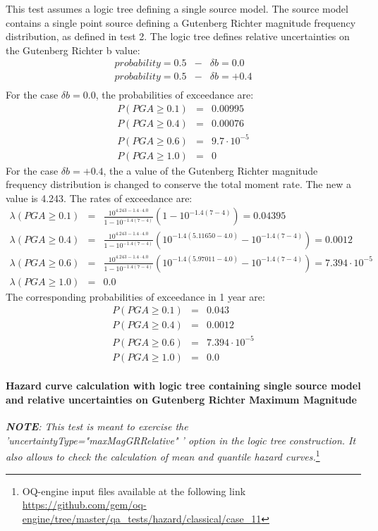 This
test assumes a logic tree defining a single source model. The source model
contains a single point source defining a Gutenberg Richter magnitude frequency
distribution, as defined in test 2. The logic tree defines relative
uncertainties on the Gutenberg Richter b value:
\begin{eqnarray}
probability = 0.5 &-& \delta b = 0.0 \nonumber \\
probability = 0.5 &-& \delta b = +0.4 \nonumber \\
\end{eqnarray}
For the case $\delta b = 0.0$, the probabilities of exceedance are:
\begin{eqnarray}
P(PGA \geq 0.1) &=& 0.00995 \nonumber \\
P(PGA \geq 0.4) &=& 0.00076 \nonumber \\
P(PGA \geq 0.6) &=& 9.7 \cdot 10^{-5} \nonumber \\
P(PGA \geq 1.0) &=& 0
\end{eqnarray}
For the case $\delta b = +0.4$, the a value of the Gutenberg Richter magnitude frequency distribution is changed to conserve the total moment rate. The
new a value is 4.243. The rates of exceedance are:
\begin{eqnarray}
\lambda(PGA \geq 0.1) &=&  \frac{10^{4.243 - 1.4 \cdot 4.0}}{1 - 10^{-1.4(7 - 4)}} (1 - 10^{-1.4(7 - 4)}) = 0.04395\nonumber \\ 
\lambda(PGA \geq 0.4) &=&  \frac{10^{4.243 - 1.4 \cdot 4.0}}{1 - 10^{-1.4(7 - 4)}} (10^{-1.4(5.11650 - 4.0)} - 10^{-1.4(7 - 4)}) = 0.0012\nonumber \\
\lambda(PGA \geq 0.6) &=&  \frac{10^{4.243 - 1.4 \cdot 4.0}}{1 - 10^{-1.4(7 - 4)}} (10^{-1.4(5.97011 - 4.0)} - 10^{-1.4(7 - 4)}) = 7.394 \cdot 10^{-5}\nonumber \\ 
\lambda(PGA \geq 1.0) &=&  0.0 
\end{eqnarray}
The corresponding probabilities of exceedance in 1 year are:
\begin{eqnarray}
P(PGA \geq 0.1) &=&  0.043\nonumber \\
P(PGA \geq 0.4) &=&  0.0012\nonumber \\
P(PGA \geq 0.6) &=&  7.394 \cdot 10^{-5}\nonumber \\
P(PGA \geq 1.0) &=& 0.0
\end{eqnarray}
%
\clearpage
%
\paragraph{Hazard curve calculation with logic tree containing single
source model and relative uncertainties on Gutenberg Richter Maximum Magnitude}
\textit{\textbf{NOTE}: This test is meant to exercise the
    'uncertaintyType="maxMagGRRelative" ' option in the logic tree construction.
    It also allows to check the calculation of mean and quantile hazard
curves.}\footnote{
    OQ-engine input files available at the following link
    \url{https://github.com/gem/oq-engine/tree/master/qa_tests/hazard/classical/case_11}}

